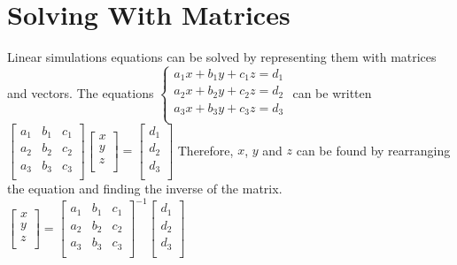 \documentclass[a4paper,12pt]{article}
\begin{document}
\section*{Solving With Matrices}
Linear simulations equations can be solved by representing them with matrices and vectors. The equations 
$\begin{cases}
a_1 x + b_1 y + c_1 z = d_1 \\
a_2 x + b_2 y + c_2 z = d_2 \\
a_3 x + b_3 y + c_3 z = d_3 \\
\end{cases}$
can be written 
$\begin{bmatrix}
a_1 & b_1 & c_1 \\
a_2 & b_2 & c_2 \\
a_3 & b_3 & c_3 \\
\end{bmatrix}
\begin{bmatrix}
x \\ y \\ z \\
\end{bmatrix} = 
\begin{bmatrix}
d_1 \\ d_2 \\ d_3 \\
\end{bmatrix}$
Therefore, $x$, $y$ and $z$ can be found by rearranging the equation and finding the inverse of the matrix. 
$\begin{bmatrix}
x \\ y \\ z \\
\end{bmatrix} = 
\begin{bmatrix}
a_1 & b_1 & c_1 \\
a_2 & b_2 & c_2 \\
a_3 & b_3 & c_3 \\
\end{bmatrix}^{-1}
\begin{bmatrix}
d_1 \\ d_2 \\ d_3 \\
\end{bmatrix}$
\end{document}
